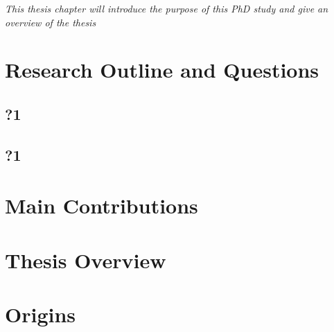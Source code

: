 \emph{This thesis chapter will introduce the purpose of this PhD
study and give an overview of the
thesis}

\section{Research Outline and Questions}
\subsection{?1}
\subsection{?1}
\section{Main Contributions}
\section{Thesis Overview}
\section{Origins}
